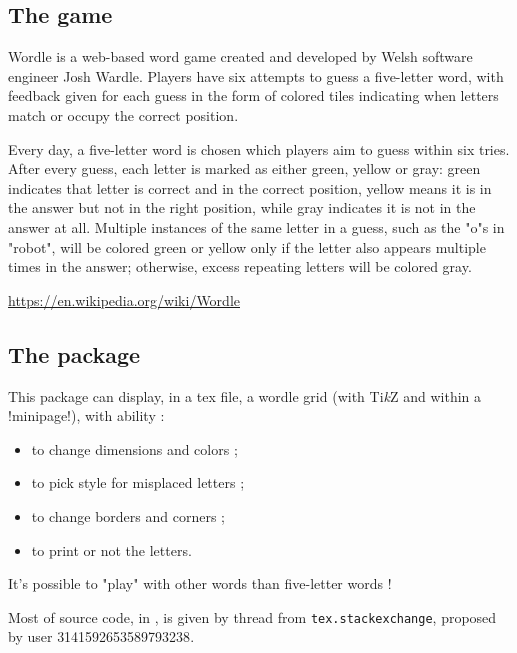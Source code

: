 \documentclass[english,a4paper,11pt]{article}
\providecommand\tikzlogo{Ti\textit{k}Z}
\let\TikZ\tikzlogo
\begin{document}
{\subsection{The game}

\begin{noteblock}
Wordle is a web-based word game created and developed by Welsh software engineer Josh Wardle. Players have six attempts to guess a five-letter word, with feedback given for each guess in the form of colored tiles indicating when letters match or occupy the correct position.

Every day, a five-letter word is chosen which players aim to guess within six tries. After every guess, each letter is marked as either green, yellow or gray: green indicates that letter is correct and in the correct position, yellow means it is in the answer but not in the right position, while gray indicates it is not in the answer at all. Multiple instances of the same letter in a guess, such as the "o"s in "robot", will be colored green or yellow only if the letter also appears multiple times in the answer; otherwise, excess repeating letters will be colored gray.

\smallskip

\hfill{\scriptsize \url{https://en.wikipedia.org/wiki/Wordle}}
\end{noteblock}

\subsection{The package}

\begin{noteblock}
This package can display, in a \textsf{tex} file, a wordle grid (with \TikZ{} and within a \motcletex!minipage!), with ability :

\begin{itemize}
	\item to change dimensions and colors ;
	\item to pick style for misplaced letters ;
	\item to change borders and corners ;
	\item to print or not the letters.
\end{itemize}

It's possible to "play" with other words than five-letter words !
\end{noteblock}

\begin{importantblock}
Most of source code, in , is given by thread from \texttt{tex.stackexchange}, proposed by user \textsf{3141592653589793238}.
\end{importantblock}

}
\end{document}
